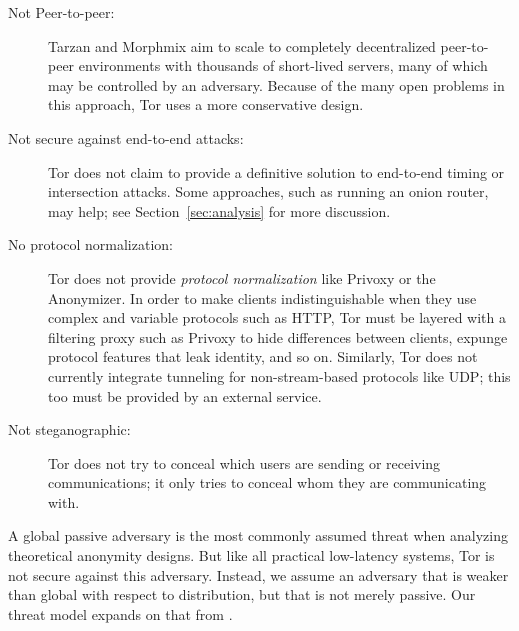 \documentclass[times,10pt,twocolumn]{article}
\begin{document}
\begin{description}
\item[Not Peer-to-peer:] Tarzan and Morphmix aim to
  scale to completely decentralized peer-to-peer environments with thousands
  of short-lived servers, many of which may be controlled by an adversary.
  Because of the many open problems in this approach, Tor uses a more
  conservative design.
\item[Not secure against end-to-end attacks:] Tor does not claim to provide a
  definitive solution to end-to-end timing or intersection attacks. Some
  approaches, such as running an onion router, may help; see
  Section~\ref{sec:analysis} for more discussion.
\item[No protocol normalization:] Tor does not provide \emph{protocol
  normalization} like Privoxy or the Anonymizer.  In order to make clients
  indistinguishable when they use complex and variable protocols such as HTTP,
  Tor must be layered with a filtering proxy such as Privoxy to hide
  differences between clients, expunge protocol features that leak identity,
  and so on.  Similarly, Tor does not currently integrate tunneling for
  non-stream-based protocols like UDP; this too must be provided by
  an external service.
\item[Not steganographic:] Tor does not try to conceal which users are
  sending or receiving communications; it only tries to conceal whom they are
  communicating with.
\end{description}

\label{subsec:threat-model}

A global passive adversary is the most commonly assumed threat when
analyzing theoretical anonymity designs. But like all practical low-latency
systems, Tor is not secure against this adversary.  Instead, we assume an
adversary that is weaker than global with respect to distribution, but that
is not merely passive.  Our threat model expands on that from
\cite{or-pet00}.
\end{document}

